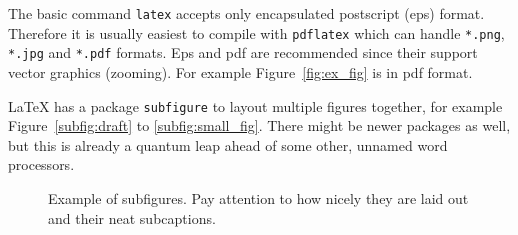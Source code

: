 \documentclass[12pt,a4paper,english
]{tunithesis}
\begin{document}



The basic command \texttt{latex} accepts only encapsulated postscript
(eps) format. Therefore it is usually easiest to compile with
\texttt{pdflatex} which can handle \verb+*.png+, \verb+*.jpg+ and
\verb+*.pdf+ formats. Eps and pdf are recommended since their support
vector graphics (zooming). For example Figure~\ref{fig:ex_fig} is in
pdf format. 


LaTeX has a package \texttt{subfigure} to layout multiple figures
together, for example Figure~\ref{subfig:draft} to
\ref{subfig:small_fig}. There might be newer packages as well, but this is
already a quantum leap ahead of some other, unnamed word processors.
\begin{figure}
  \begin{center}
    \qquad                        %
    \caption[Example of subfigures]{Example of subfigures. Pay attention to how nicely they
      are laid out and their neat subcaptions.}

    \label{fig:subfigs}
  \end{center}
\end{figure}
\end{document}
